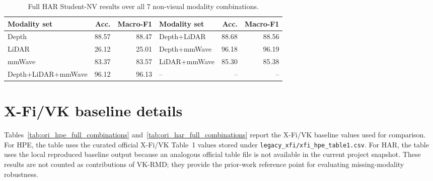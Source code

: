 \documentclass[preprint,12pt]{elsarticle}
\newcommand{\method}{VK-RMD}
\begin{document}
\begin{table}[h]
\centering
\caption{Full HAR Student-NV results over all 7 non-visual modality combinations.}
\label{tab:har_nv_full_combinations}
\scriptsize
\begin{adjustbox}{width=\textwidth}
\begin{tabular}{lrr|lrr}
\toprule
Modality set & Acc. & Macro-F1 & Modality set & Acc. & Macro-F1 \\
\midrule
Depth & 88.57 & 88.47 & Depth+LiDAR & 88.68 & 88.56 \\
LiDAR & 26.12 & 25.01 & Depth+mmWave & 96.18 & 96.19 \\
mmWave & 83.37 & 83.57 & LiDAR+mmWave & 85.30 & 85.38 \\
Depth+LiDAR+mmWave & 96.12 & 96.13 & -- & -- & -- \\
\bottomrule
\end{tabular}
\end{adjustbox}
\end{table}

\section{X-Fi/VK baseline details}

Tables~\ref{tab:ori_hpe_full_combinations} and~\ref{tab:ori_har_full_combinations} report the X-Fi/VK baseline values used for comparison. For HPE, the table uses the curated official X-Fi/VK Table~1 values stored under \texttt{legacy\_xfi/xfi\_hpe\_table1.csv}. For HAR, the table uses the local reproduced baseline output because an analogous official table file is not available in the current project snapshot. These results are not counted as contributions of \method{}; they provide the prior-work reference point for evaluating missing-modality robustness.
\end{document}
